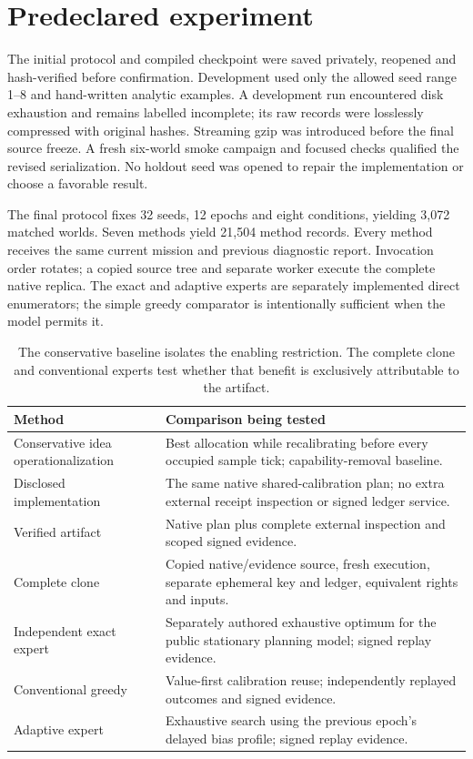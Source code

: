 \section{Predeclared experiment}
The initial protocol and compiled checkpoint were saved privately, reopened and hash-verified before confirmation. Development used only the allowed seed range 1--8 and hand-written analytic examples. A development run encountered disk exhaustion and remains labelled incomplete; its raw records were losslessly compressed with original hashes. Streaming gzip was introduced before the final source freeze. A fresh six-world smoke campaign and focused checks qualified the revised serialization. No holdout seed was opened to repair the implementation or choose a favorable result.

The final protocol fixes 32 seeds, 12 epochs and eight conditions, yielding 3,072 matched worlds. Seven methods yield 21,504 method records. Every method receives the same current mission and previous diagnostic report. Invocation order rotates; a copied source tree and separate worker execute the complete native replica. The exact and adaptive experts are separately implemented direct enumerators; the simple greedy comparator is intentionally sufficient when the model permits it.

\begin{table}[H]\small\renewcommand{\arraystretch}{1.13}
\begin{tabularx}{\textwidth}{@{}p{}X@{}}\toprule
Method & Comparison being tested\\\midrule
Conservative idea operationalization & Best allocation while recalibrating before every occupied sample tick; capability-removal baseline.\\
Disclosed implementation & The same native shared-calibration plan; no extra external receipt inspection or signed ledger service.\\
Verified artifact & Native plan plus complete external inspection and scoped signed evidence.\\
Complete clone & Copied native/evidence source, fresh execution, separate ephemeral key and ledger, equivalent rights and inputs.\\
Independent exact expert & Separately authored exhaustive optimum for the public stationary planning model; signed replay evidence.\\
Conventional greedy & Value-first calibration reuse; independently replayed outcomes and signed evidence.\\
Adaptive expert & Exhaustive search using the previous epoch's delayed bias profile; signed replay evidence.\\\bottomrule
\end{tabularx}
\caption{The conservative baseline isolates the enabling restriction. The complete clone and conventional experts test whether that benefit is exclusively attributable to the artifact.}
\end{table}

